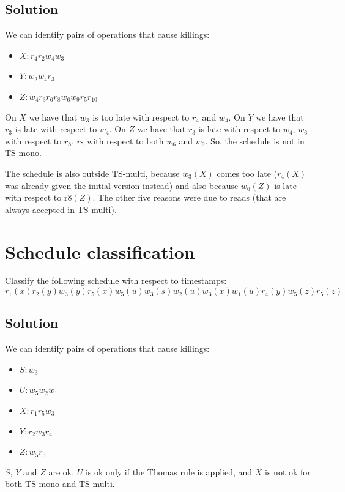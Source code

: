 \documentclass[12pt, a4paper]{report}
\newtheorem[style=M,bodystyle=\normalfont]{theorem}{Theorem}
\newtheorem[style=M,bodystyle=\normalfont]{corollary}{Corollary}
\newtheorem[style=M,bodystyle=\normalfont]{lemma}{Lemma}
\newtheorem[style=M,bodystyle=\normalfont]{definition}{Definition}
\begin{document}
    \subsection*{Solution}
        We can identify pairs of operations that cause killings:
        \begin{itemize}
            \item $X: r_4 r_2 w_4 w_3$
            \item $Y: w_2 w_4 r_3$
            \item $Z: w_4 r_3 r_6 r_8 w_6 w_9 r_5 r_{10}$
        \end{itemize}
        On $X$ we have that $w_3$ is too late with respect to $r_4$ and $w_4$. On $Y$ we have that $r_3$ is late with respect to $w_4$. On 
        $Z$ we have that $r_3$ is late with respect to $w_4$, $w_6$ with respect to $r_8$, $r_5$ with respect to both $w_6$ and $w_9$. 
        So, the schedule is not in TS-mono. 

        The schedule is also outside TS-multi, because $w_3(X)$ comes too late ($r_4(X)$ was already given the initial version instead) and 
        also because $w_6(Z)$ is late with respect to r$8(Z)$. The other five reasons were due to reads (that are always accepted in TS-multi).

    \newpage

    \section{Schedule classification}
        Classify the following schedule with respect to timestamps: 
        \[r_1(x) r_2(y) w_3(y) r_5(x) w_5(u) w_3(s) w_2(u) w_3(x) w_1(u) r_4(y) w_5(z) r_5(z)\]
    \subsection*{Solution}
        We can identify pairs of operations that cause killings:
        \begin{itemize}
            \item $S:w_3$
            \item $U:w_5w_2w_1$
            \item $X:r_1r_5w_3$
            \item $Y:r_2w_3r_4$
            \item $Z:w_5r_5$
        \end{itemize}
        $S$, $Y$ and $Z$ are ok, $U$ is ok only if the Thomas rule is applied, and $X$ is not ok for both TS-mono and TS-multi. 
\end{document}
